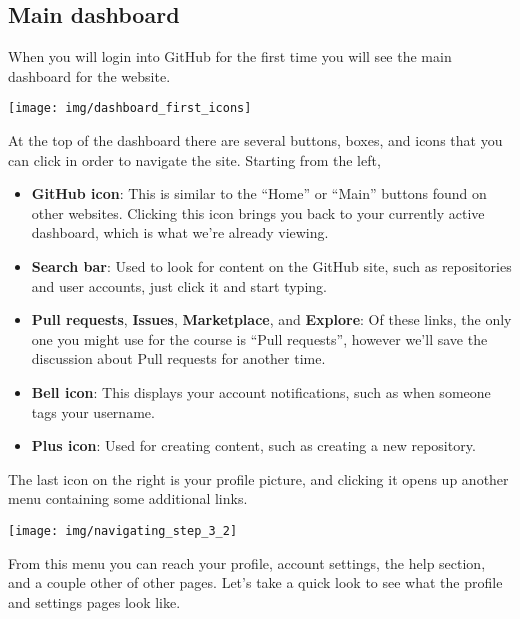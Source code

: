 \documentclass[
]{book}
\begin{document}
\hypertarget{github-navigation-main-dashboard}{%
\subsection{Main dashboard}\label{github-navigation-main-dashboard}}

When you will login into GitHub for the first time you will see the main dashboard for the website.

\begin{center}\texttt{[image: img/dashboard\_first\_icons]} \end{center}

At the top of the dashboard there are several buttons, boxes, and icons that you can click in order to navigate the site.
Starting from the left,

\begin{itemize}
\item
  \textbf{GitHub icon}: This is similar to the ``Home'' or ``Main'' buttons found on other websites.
  Clicking this icon brings you back to your currently active dashboard, which is what we're already viewing.
\item
  \textbf{Search bar}: Used to look for content on the GitHub site, such as repositories and user accounts, just click it and start typing.
\item
  \textbf{Pull requests}, \textbf{Issues}, \textbf{Marketplace}, and \textbf{Explore}: Of these links, the only one you might use for the course is ``Pull requests'', however we'll save the discussion about Pull requests for another time.
\item
  \textbf{Bell icon}: This displays your account notifications, such as when someone tags your username.
\item
  \textbf{Plus icon}: Used for creating content, such as creating a new repository.
\end{itemize}

The last icon on the right is your profile picture, and clicking it opens up another menu containing some additional links.

\begin{center}\texttt{[image: img/navigating\_step\_3\_2]} \end{center}

From this menu you can reach your profile, account settings, the help section, and a couple other of other pages.
Let's take a quick look to see what the profile and settings pages look like.
\end{document}
